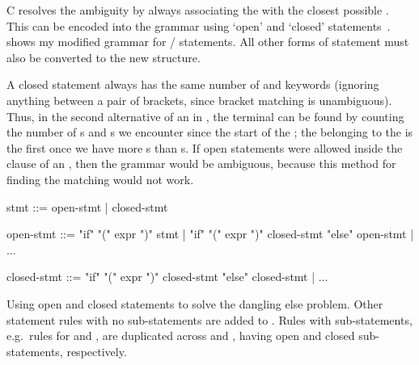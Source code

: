 \documentclass[00-main.tex]{subfiles}
\begin{document}
C resolves the ambiguity by always associating the  with the closest possible .
This can be encoded into the grammar using `open' and `closed' statements~.
 shows my modified grammar for / statements.
All other forms of statement must also be converted to the new structure.

A closed statement always has the same number of  and  keywords (ignoring anything between a pair of brackets, since bracket matching is unambiguous).
Thus, in the second alternative of an  in , the  terminal can be found by counting the number of s and s we encounter since the start of the ; the  belonging to the  is the first  once we have more s than s.
If open statements were allowed inside the  clause of an , then the grammar would be ambiguous, because this method for finding the matching  would not work.


\begin{listing}[t]
  \begin{GrammarListing}
    stmt        ::= open-stmt | closed-stmt

    open-stmt   ::= "if" "(" expr ")" stmt
                  | "if" "(" expr ")" closed-stmt "else" open-stmt
                  | ...

    closed-stmt ::= "if" "(" expr ")" closed-stmt "else" closed-stmt
                  | ...
  \end{GrammarListing}
  \caption{Using open and closed statements to solve the dangling else problem. Other statement rules with no sub-statements are added to . Rules with sub-statements, e.g.~rules for  and , are duplicated across  and , having open and closed sub-statements, respectively.\medskip}
  \label{lst:open/closed statement grammar}
\end{listing}
\end{document}
